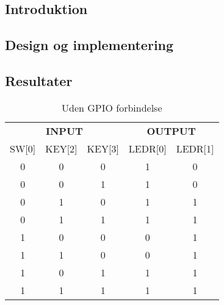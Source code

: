 \documentclass[../journal2.tex]{subfiles}
\begin{document}
\subsection{Introduktion}

\subsection{Design og implementering}

\subsection{Resultater}

\begin{table}[!hbt]
    \begin{tabular}{ccc|cc}
    \multicolumn{3}{c}{\textbf{INPUT}}   &
    \multicolumn{2}{c}{\textbf{OUTPUT}} \\
    SW{[}0{]} & KEY{[}2{]} & KEY{[}3{]} & LEDR{[}0{]} & LEDR{[}1{]} \\ \hline
    0         & 0          & 0          & 1           & 0           \\
    0         & 0          & 1          & 1           & 0           \\
    0         & 1          & 0          & 1           & 1           \\
    0         & 1          & 1          & 1           & 1           \\
    1         & 0          & 0          & 0           & 1           \\
    1         & 1          & 0          & 0           & 1           \\
    1         & 0          & 1          & 1           & 1           \\
    1         & 1          & 1          & 1           & 1          
    \end{tabular}
    \centering
    \caption{Uden GPIO forbindelse}
\end{table}
\end{document}
